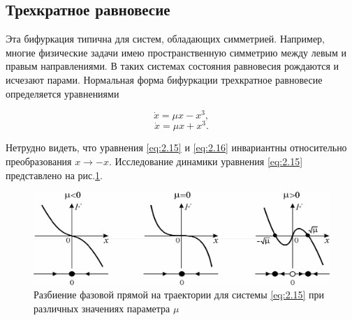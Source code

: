 
\subsection{Трехкратное равновесие} %

Эта бифуркация типична для систем, обладающих симметрией.
Например, многие физические задачи имею пространственную симметрию
между левым и правым направлениями. В таких системах состояния
равновесия рождаются и исчезают парами. Нормальная форма бифуркации
трехкратное равновесие определяется уравнениями

\begin{equation}
	\label{eq:2.15}
	\dot x = \mu x - x^3,
\end{equation}
\begin{equation}
	\label{eq:2.16}
	\dot x = \mu x + x^3. 
\end{equation}

Нетрудно видеть, что уравнения \eqref{eq:2.15} и \eqref{eq:2.16} инвариантны относительно
преобразования $x \rightarrow -x$. Исследование динамики уравнения \eqref{eq:2.15} представлено
на рис.\ref{fig:2.9}.

\begin{figure}[h!]
	\centering
	\includegraphics[width=\linewidth]{fig/lect2/9}
	\caption{Разбиение фазовой прямой на траектории для системы \eqref{eq:2.15} при различных значениях параметра $\mu$}
	\label{fig:2.9}
\end{figure}



